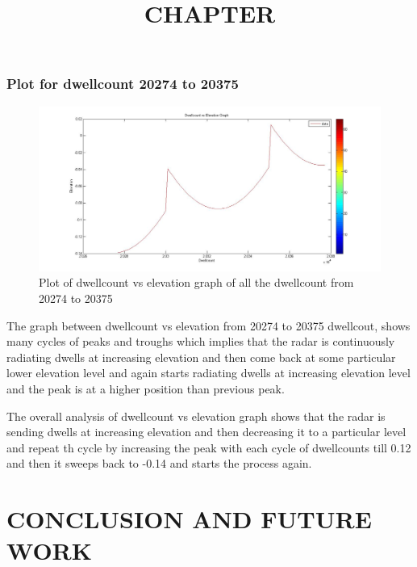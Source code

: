 \documentclass[14pt]{article} %
\begin{document}
   \subsubsection{Plot for dwellcount 20274 to 20375}
   \begin{figure}[H]
  \centerline{\includegraphics[width=\linewidth]{elevation(20000,20100).jpg}}
  \caption{Plot of dwellcount vs elevation graph of all the dwellcount from 20274 to 20375}
  \label{fig:figure 23(c)}
  \end{figure}
  \begin{tcolorbox}[title =\textbf{Analysis}]
  The graph  between dwellcount vs elevation from 20274 to 20375 dwellcout, shows many cycles of peaks and troughs which implies that the radar is continuously radiating dwells at increasing elevation and then come back at some particular lower elevation level and again starts radiating dwells at increasing elevation level and the peak is at a higher position than previous peak.
  \end{tcolorbox}
  \begin{tcolorbox}[colframe=red]
    The overall analysis of dwellcount vs elevation graph shows that the radar is sending  dwells at increasing elevation and then decreasing it to a particular level and repeat th cycle by increasing the peak with each cycle of dwellcounts till 0.12 and then it sweeps back to -0.14 and starts the process again.
   \end{tcolorbox}
   
   \title{CHAPTER }
\maketitle
\section{CONCLUSION AND FUTURE WORK}
\end{document}
